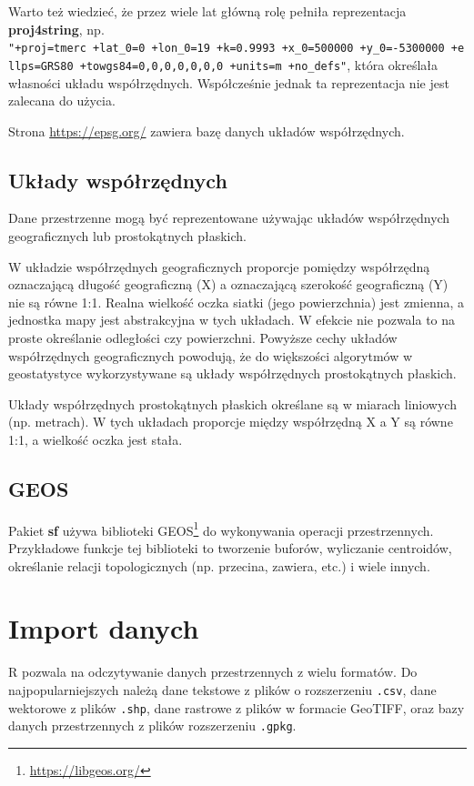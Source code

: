 \documentclass[
  paper=6in:9in,pagesize=pdftex,headinclude=on,footinclude=on,10pt]{scrbook}
\renewcommand{\href}[2]{#2 (\url{#1})}
\renewcommand{\href}[2]{#2\footnote{\url{#1}}}
\begin{document}
Warto też wiedzieć, że przez wiele lat główną rolę pełniła reprezentacja \textbf{proj4string}, np. \texttt{"+proj=tmerc\ +lat\_0=0\ +lon\_0=19\ +k=0.9993\ +x\_0=500000\ +y\_0=-5300000\ +ellps=GRS80\ +towgs84=0,0,0,0,0,0,0\ +units=m\ +no\_defs"}, która określała własności układu współrzędnych.
Współcześnie jednak ta reprezentacja nie jest zalecana do użycia.

Strona \url{https://epsg.org/} zawiera bazę danych układów współrzędnych.

\subsection{Układy współrzędnych}\label{ukux142ady-wspuxf3ux142rzux119dnych}

Dane przestrzenne mogą być reprezentowane używając układów współrzędnych geograficznych lub prostokątnych płaskich.

W układzie współrzędnych geograficznych proporcje pomiędzy współrzędną oznaczającą długość geograficzną (X) a oznaczającą szerokość geograficzną (Y) nie są równe 1:1.
Realna wielkość oczka siatki (jego powierzchnia) jest zmienna, a jednostka mapy jest abstrakcyjna w tych układach.
W efekcie nie pozwala to na proste określanie odległości czy powierzchni.
Powyższe cechy układów współrzędnych geograficznych powodują, że do większości algorytmów w geostatystyce wykorzystywane są układy współrzędnych prostokątnych płaskich.

Układy współrzędnych prostokątnych płaskich określane są w miarach liniowych (np. metrach).
W tych układach proporcje między współrzędną X a Y są równe 1:1, a wielkość oczka jest stała.

\subsection{GEOS}\label{geos}

Pakiet \textbf{sf} używa biblioteki \href{https://libgeos.org/}{GEOS} do wykonywania operacji przestrzennych.
Przykładowe funkcje tej biblioteki to tworzenie buforów, wyliczanie centroidów, określanie relacji topologicznych (np. przecina, zawiera, etc.) i wiele innych.

\section{Import danych}\label{import-danych}

R pozwala na odczytywanie danych przestrzennych z wielu formatów.
Do najpopularniejszych należą dane tekstowe z plików o rozszerzeniu \texttt{.csv}, dane wektorowe z plików \texttt{.shp}, dane rastrowe z plików w formacie GeoTIFF, oraz bazy danych przestrzennych z plików rozszerzeniu \texttt{.gpkg}.
\end{document}
